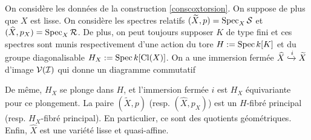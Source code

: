 \begin{cons}\label{conscoxtorsionlisse}
On considère les données de la construction \ref{conscoxtorsion}. On suppose de plus que $X$ est lisse. On considère les spectres relatifs $(\widetilde{X}, p)=\operatorname{Spec}_X \mathcal{S}$ et $(\widehat{X},p_X)=\operatorname{Spec}_X \mathcal{R}$. De plus, on peut toujours supposer $K$ de type fini et ces spectres sont munis respectivement d'une action du tore $H:=\operatorname{Spec} k[K]$ et du groupe diagonalisable $H_X:=\operatorname{Spec} k[\operatorname{Cl}(X)]$. On a une immersion fermée $\widehat{X}\xhookrightarrow{i}\widetilde{X}$ d'image $\mathcal{V}(\mathcal{I})$ qui donne un diagramme commutatif

	\begin{center}
	\end{center}
De même, $H_X$ se plonge dans $H$, et l'immersion fermée $i$ est $H_X$ équivariante pour ce plongement. La paire $(\widetilde{X},p)$ (resp. $(\widehat{X},p_X)$) est un $H$-fibré principal (resp. $H_X$-fibré principal). En particulier, ce sont des quotients géométriques. Enfin, $\widehat{X}$ est une variété lisse et quasi-affine.
\end{cons}
